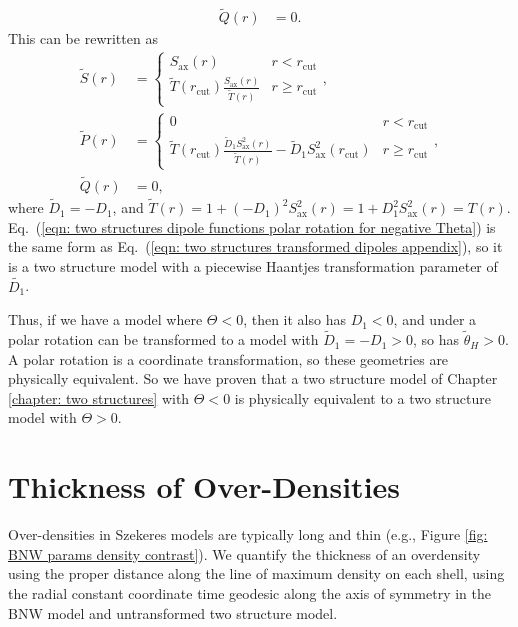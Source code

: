 \documentclass[a4paper,12pt]{report}
\renewcommand{\eqref}[1]{Eq.~({#1})}
\begin{document}
\begin{appendices}
\begin{subequations}
\begin{align}
        \tilde{Q}(r) &= 0.
    \end{align}
\end{subequations}
This can be rewritten as
\begin{subequations}
    \begin{align}\label{eqn: two structures dipole functions polar rotation for negative Theta}
        \tilde{S}(r) &=
        \begin{cases}
            S_\text{ax}(r) & r < r_\text{cut} \\
            \tilde{T}(r_\text{cut})\frac{S_\text{ax}(r)}{\tilde{T}(r)}  & r \geq r_\text{cut}
        \end{cases}, \\
        \tilde{P}(r) &=
        \begin{cases}
            0 & r < r_\text{cut} \\
            \tilde{T}(r_\text{cut})\frac{\tilde{D}_1 S_\text{ax}^2(r)}{\tilde{T}(r)} - \tilde{D}_1 S_\text{ax}^2(r_\text{cut}) & r \geq r_\text{cut}
        \end{cases}, \\
        \tilde{Q}(r) &= 0,
    \end{align}
\end{subequations}
where $\tilde{D}_1 = -D_1$, and $\tilde{T}(r) = 1 + (-D_1)^2 S_\text{ax}^2 (r) = 1 + D_1^2 S_\text{ax}^2 (r) = T(r)$. \eqref{\ref{eqn: two structures dipole functions polar rotation for negative Theta}} is the same form as \eqref{\ref{eqn: two structures transformed dipoles appendix}}, so it is a two structure model with a piecewise Haantjes transformation parameter of $\tilde{D_1}$.

Thus, if we have a model where $\Theta < 0$, then it also has $D_1 < 0$, and under a polar rotation can be transformed to a model with $\tilde{D}_1 = -D_1 > 0$, so has $\tilde{\theta}_H > 0$. A polar rotation is a coordinate transformation, so these geometries are physically equivalent. So we have proven that a two structure model of Chapter \ref{chapter: two structures} with $\Theta < 0$ is physically equivalent to a two structure model with $\Theta > 0$.


\chapter{Thickness of Over-Densities}\label{appendix: overdensity thickness}
Over-densities in Szekeres models are typically long and thin (e.g., Figure \ref{fig: BNW params density contrast}). We quantify the thickness of an overdensity using the proper distance along the line of maximum density on each shell, using the radial constant coordinate time geodesic along the axis of symmetry in the BNW model and untransformed two structure model.


\end{appendices}
\end{document}
